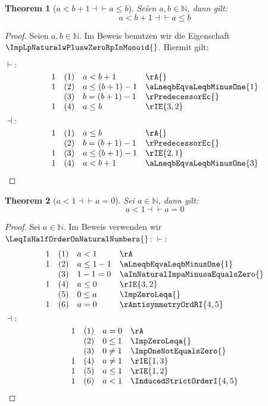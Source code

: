 \documentclass{book}
\theoremstyle{plain}
\newtheorem{theorem}{Theorem}
\theoremstyle{remark}
\theoremstyle{definition}
\begin{document}
\label{aLneqbPlusOneEqvaLeqb}
\begin{theorem}[\(a<b+1\dashv\vdash a\leq b\)]
Seien \(a,b\in\mathbb{N}\), dann gilt:
\[a<b+1\dashv\vdash a\leq b\]
\end{theorem}
\begin{proof}
        Seien \(a,b\in\mathbb{N}\). Im Beweis benutzen wir die Eigenschaft \(\ImpLpNaturalwPluswZeroRpInMonoid{}\). Hiermit gilt:

        
\(\vdash:\)
\[
\begin{array}{llll}
            1 & (1) & a<b+1  & \rA{} \\
            1 & (2) & a\leq (b+1)-1  & \aLneqbEqvaLeqbMinusOne{1} \\
              & (3) & b=(b+1)-1  & \rPredecessorEc{} \\
            1 & (4) & a\leq b  & \rIE{3,2} \\
\end{array}
\]
\(\dashv:\)
\[
\begin{array}{llll}
            1 & (1) & a\leq b  & \rA{} \\
              & (2) & b=(b+1)-1  & \rPredecessorEc{} \\
            1 & (3) & a\leq (b+1)-1  & \rIE{2,1} \\
            1 & (4) & a<b+1  & \aLneqbEqvaLeqbMinusOne{3} \\
\end{array}
\]
\end{proof}

\label{aInNaturalLpaLneqOneEqvaEqualsZeroRp}
\begin{theorem}[\(a<1\dashv\vdash a=0\)]
Sei \(a\in\mathbb{N}\), dann gilt:
\[a<1\dashv\vdash a=0\]
\end{theorem}
\begin{proof}
Sei \(a\in\mathbb{N}\). Im Beweis verwenden wir \(\LeqIsHalfOrderOnNaturalNumbers{}\):
\(\vdash:\)
	\[
	\begin{array}{llll}
		1 & (1) & a<1 & \rA \\
		1 & (2) & a\leq 1-1 & \aLneqbEqvaLeqbMinusOne{1} \\
		   & (3) & 1-1=0 & \aInNaturalImpaMinusaEqualsZero{} \\
        1 & (4) & a\leq 0 & \rIE{3,2} \\
          & (5) & 0\leq a & \ImpZeroLeqa{} \\
        1 & (6) & a=0 & \rAntisymmetryOrdRI{4,5} \\
	\end{array}
	\]
	\(\dashv:\)
	\[
	\begin{array}{llll}
		1 & (1) & a=0 & \rA \\
          & (2) & 0\leq 1 & \ImpZeroLeqa{} \\
          & (3) & 0\neq 1 & \ImpOneNotEqualsZero{} \\
        1 & (4) & a\neq 1 & \rIE{1,3} \\
        1 & (5) & a\leq 1 & \rIE{1,2} \\
        1 & (6) & a<1 & \InducedStrictOrderI{4,5} \\
	\end{array}
	\]
\end{proof}
\end{document}
